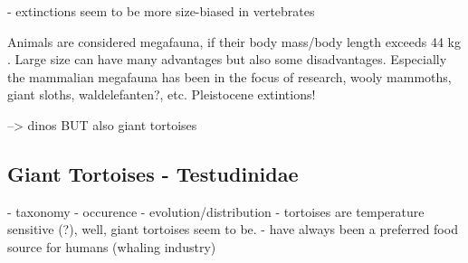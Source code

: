 - extinctions seem to be more size-biased in vertebrates


Animals are considered megafauna, if their body mass/body length exceeds 44 kg \citep{Barnosky2004}.
Large size can have many advantages but also some disadvantages.
Especially the mammalian megafauna has been in the focus of research, wooly mammoths, giant sloths, waldelefanten?, etc.
Pleistocene extintions!


--> dinos BUT also giant tortoises


\subsection{Giant Tortoises - Testudinidae}
- taxonomy
- occurence
- evolution/distribution
- tortoises are temperature sensitive (?), well, giant tortoises seem to be.
- have always been a preferred food source for humans (whaling industry)

